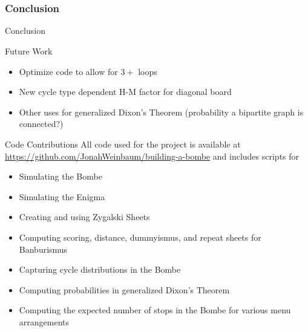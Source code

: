 \documentclass[hyphens,aspectratio=169]{beamer}
\begin{document}

\part{}
\section{Conclusion}

\begin{frame}[fragile]{}
	\Huge
	\begin{center}
		Conclusion
	\end{center}
\end{frame}

\begin{frame}[fragile]{Future Work}
\begin{itemize}
    \item Optimize code to allow for $3+$ loops
    \pause
    \vspace{1em}
    \item New cycle type dependent H-M factor for diagonal board
    \pause
    \vspace{1em}
    \item Other uses for generalized Dixon's Theorem (probability a bipartite graph is connected?)
\end{itemize}
\end{frame}

\begin{frame}[fragile]{Code Contributions}
All code used for the project is available at \url{https://github.com/JonahWeinbaum/building-a-bombe} and includes scripts for
\begin{itemize}
  \item Simulating the Bombe
  \item Simulating the Enigma
  \item Creating and using Zygalski Sheets
  \item Computing scoring, distance, dummyismus, and repeat sheets
    for Banburismus
  \item Capturing cycle distributions in the Bombe
  \item Computing probabilities in generalized Dixon's Theorem
  \item Computing the expected number of stops in the Bombe for
    various menu arrangements
\end{itemize}
\end{frame}
\end{document}
